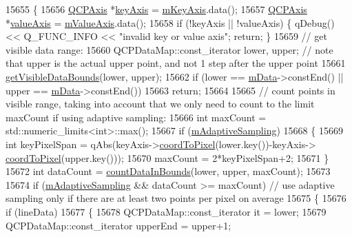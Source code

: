 \begin{DoxyCode}
15655 \{
15656   \hyperlink{class_q_c_p_axis}{QCPAxis} *\hyperlink{class_q_c_p_abstract_plottable_a72c7a09c22963f2c943f07112b311103}{keyAxis} = \hyperlink{class_q_c_p_abstract_plottable_a426f42e254d0f8ce5436a868c61a6827}{mKeyAxis}.data();
15657   \hyperlink{class_q_c_p_axis}{QCPAxis} *\hyperlink{class_q_c_p_abstract_plottable_a3106f9d34d330a6097a8ec5905e5b519}{valueAxis} = \hyperlink{class_q_c_p_abstract_plottable_a2901452ca4aea911a1827717934a4bda}{mValueAxis}.data();
15658   \textcolor{keywordflow}{if} (!keyAxis || !valueAxis) \{ qDebug() << Q\_FUNC\_INFO << \textcolor{stringliteral}{"invalid key or value axis"}; \textcolor{keywordflow}{return}; \}
15659   \textcolor{comment}{// get visible data range:}
15660   QCPDataMap::const\_iterator lower, upper; \textcolor{comment}{// note that upper is the actual upper point, and not 1 step
       after the upper point}
15661   \hyperlink{class_q_c_p_graph_a6a317cb14a83dae0841c7041a63d6d9d}{getVisibleDataBounds}(lower, upper);
15662   \textcolor{keywordflow}{if} (lower == \hyperlink{class_q_c_p_graph_a8457c840f69a0ac49f61d30a509c5d08}{mData}->constEnd() || upper == \hyperlink{class_q_c_p_graph_a8457c840f69a0ac49f61d30a509c5d08}{mData}->constEnd())
15663     \textcolor{keywordflow}{return};
15664   
15665   \textcolor{comment}{// count points in visible range, taking into account that we only need to count to the limit maxCount if
       using adaptive sampling:}
15666   \textcolor{keywordtype}{int} maxCount = std::numeric\_limits<int>::max();
15667   \textcolor{keywordflow}{if} (\hyperlink{class_q_c_p_graph_aa951e78aeba714cf443be6da2e52502e}{mAdaptiveSampling})
15668   \{
15669     \textcolor{keywordtype}{int} keyPixelSpan = qAbs(keyAxis->\hyperlink{class_q_c_p_axis_a985ae693b842fb0422b4390fe36d299a}{coordToPixel}(lower.key())-keyAxis->
      \hyperlink{class_q_c_p_axis_a985ae693b842fb0422b4390fe36d299a}{coordToPixel}(upper.key()));
15670     maxCount = 2*keyPixelSpan+2;
15671   \}
15672   \textcolor{keywordtype}{int} dataCount = \hyperlink{class_q_c_p_graph_a13f6a3aa60227e03ab1f7aa8eec6589f}{countDataInBounds}(lower, upper, maxCount);
15673   
15674   \textcolor{keywordflow}{if} (\hyperlink{class_q_c_p_graph_aa951e78aeba714cf443be6da2e52502e}{mAdaptiveSampling} && dataCount >= maxCount) \textcolor{comment}{// use adaptive sampling only if there
       are at least two points per pixel on average}
15675   \{
15676     \textcolor{keywordflow}{if} (lineData)
15677     \{
15678       QCPDataMap::const\_iterator it = lower;
15679       QCPDataMap::const\_iterator upperEnd = upper+1;

\end{DoxyCode}
